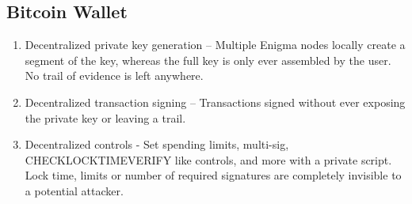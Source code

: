 \documentclass{article} \usepackage{nips13submit_e,times}
\begin{document}
\subsection{Bitcoin Wallet}

\begin{enumerate}
    \item Decentralized private key generation -- Multiple Enigma nodes locally create a segment of the key, whereas the full key is only ever assembled by the user. No trail of evidence is left anywhere.
    
    \item Decentralized transaction signing -- Transactions signed without ever exposing the private key or leaving a trail.
    
    \item Decentralized controls - Set spending limits, multi-sig, CHECKLOCKTIMEVERIFY like controls, and more with a private script. Lock time, limits or number of required signatures are completely invisible to a potential attacker.
    
\end{enumerate}
\end{document}

